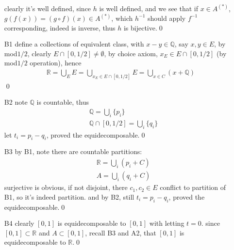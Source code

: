 \documentclass[paper=a4, fontsize=11pt]{scrartcl} %
\numberwithin{equation}{section} %
\numberwithin{figure}{section} %
\numberwithin{table}{section} %
\begin{document}
\begin{itemize}
\begin{align}
	 \end{align}
	 clearly it's well defined, since $h$ is well defined, and we see that if $x\in A^{(*)}$, $g(f(x)) = (g\circ f)(x) \in A^{(*)}$, which $h^{-1}$ should apply $f^{-1}$ corresponding, indeed is inverse, thus $h$ is bijective.\qed
	 \item[B1] define a collections of equivalent class, with $x-y\in \mathbb{Q}$, say $x,y\in E$, by mod$1/2$, clearly $E\cap [0,1/2]\neq \emptyset$, by choice axiom, $x_E\in E\cap [0,1/2]$ (by mod$1/2$ operation), hence
	 \begin{align}
	 	\mathbb{R} = \bigcup_{E} E = \bigcup_{x_E\in E\cap [0,1/2]} E = \bigcup_{x\in C}(x+\mathbb{Q})
	 \end{align}\qed
	 \item[B2] note $\mathbb{Q}$ is countable, thus
	 \begin{align}
	 	&\mathbb{Q} = \bigcup_i \{p_i\} \\
	 	&\mathbb{Q}\cap [0,1/2] = \bigcup_i \{q_i\}
	 \end{align}
	 let $t_i = p_i-q_i$, proved the equidecomposable.\qed
	 \item[B3] by B1, note there are countable partitions:
	 \begin{align}
	 	&\mathbb{R}  =  \bigcup_i (p_i + C)\\
	 	&A = \bigcup_i(q_i+C)
	 \end{align}
	 surjective is obvious, if not disjoint, there $c_1,c_2\in E$ conflict to partition of B1, so it's indeed partition. and by B2, still $t_i=p_i-q_i$, proved the equidecomposable.\qed
	 \item[B4] clearly $[0,1]$ is equidecomposable to $[0,1]$ with letting $t=0$. since $[0,1]\subset \mathbb{R}$ and $A\subset [0,1]$, recall B3 and A2, that $[0,1]$ is equidecomposable to $\mathbb{R}$.\qed
\end{itemize}
\end{document}
